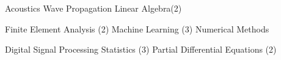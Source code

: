 
\begin{coursework}

  \cvcoursev
    {Acoustics}
    {Wave Propagation}
    {Linear Algebra(2)}


  \cvcoursev
    {Finite Element Analysis (2)}
    {Machine Learning (3)}
    {Numerical Methods}
   

  \cvcoursev
    {Digital Signal Processing}
    {Statistics (3)}
    {Partial Differential Equations (2)}

\end{coursework}

